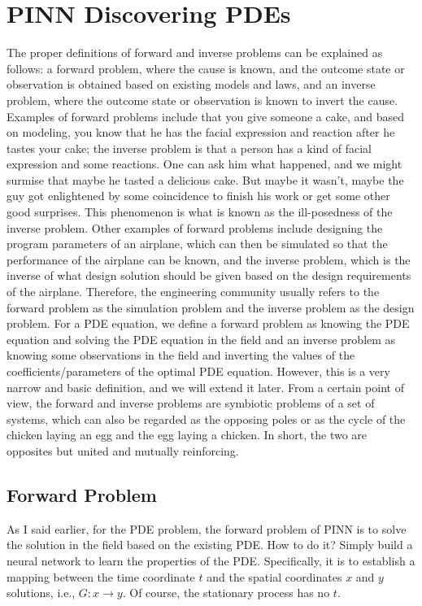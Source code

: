\documentclass[12pt]{article}
\begin{document}
\section{PINN Discovering PDEs}
\label{sec:intro}
The proper definitions of forward and inverse problems can be explained as follows: a forward problem, where the cause is known, and the outcome state or observation is obtained based on existing models and laws, and an inverse problem, where the outcome state or observation is known to invert the cause. Examples of forward problems include that you give someone a cake, and based on modeling, you know that he has the facial expression and reaction after he tastes your cake; the inverse problem is that a person has a kind of facial expression and some reactions. One can ask him what happened, and we might surmise that maybe he tasted a delicious cake. But maybe it wasn't, maybe the guy got enlightened by some coincidence to finish his work or get some other good surprises. This phenomenon is what is known as the ill-posedness of the inverse problem. Other examples of forward problems include designing the program parameters of an airplane, which can then be simulated so that the performance of the airplane can be known, and the inverse problem, which is the inverse of what design solution should be given based on the design requirements of the airplane. Therefore, the engineering community usually refers to the forward problem as the simulation problem and the inverse problem as the design problem. For a PDE equation, we define a forward problem as knowing the PDE equation and solving the PDE equation in the field and an inverse problem as knowing some observations in the field and inverting the values of the coefficients/parameters of the optimal PDE equation. However, this is a very narrow and basic definition, and we will extend it later. From a certain point of view, the forward and inverse problems are symbiotic problems of a set of systems, which can also be regarded as the opposing poles or as the cycle of the chicken laying an egg and the egg laying a chicken. In short, the two are opposites but united and mutually reinforcing.

\subsection{Forward Problem}
As I said earlier, for the PDE problem, the forward problem of PINN is to solve the solution in the field based on the existing PDE. How to do it? Simply build a neural network to learn the properties of the PDE. Specifically, it is to establish a mapping between the time coordinate $t$ and the spatial coordinates $x$ and $y$ solutions, i.e., $G: x\to y$. Of course, the stationary process has no $t$.
\end{document}
